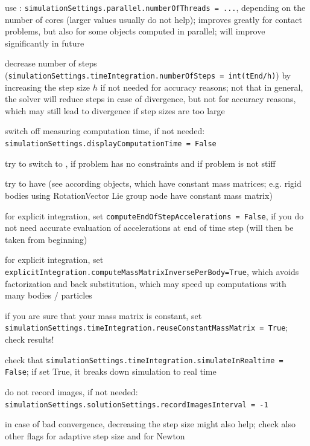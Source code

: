   \item use : \texttt{simulationSettings.parallel.numberOfThreads = ...}, depending on the number of cores (larger values usually do not help); improves greatly for contact problems, but also for some objects computed in parallel; will improve significantly in future
  \item decrease number of steps (\texttt{simulationSettings.timeIntegration.numberOfSteps = int(tEnd/h)}) by increasing the step size $h$ if not needed for accuracy reasons; not that in general, the solver will reduce steps in case of divergence, but not for accuracy reasons, which may still lead to divergence if step sizes are too large
  \item switch off measuring computation time, if not needed: \texttt{simulationSettings.displayComputationTime = False}
  \item try to switch to , if problem has no constraints and if problem is not stiff
  \item try to have  (see according objects, which have constant mass matrices; e.g. rigid bodies using RotationVector Lie group node have constant mass matrix)
  \item for explicit integration, set \texttt{computeEndOfStepAccelerations = False}, if you do not need accurate evaluation of accelerations at end of time step (will then be taken from beginning)
  \item for explicit integration, set \texttt{explicitIntegration.computeMassMatrixInversePerBody=True}, which avoids factorization and back substitution, which may speed up computations with many bodies / particles
  \item if you are sure that your mass matrix is constant, set \texttt{simulationSettings.timeIntegration.reuseConstantMassMatrix = True}; check results!
  \item check that \texttt{simulationSettings.timeIntegration.simulateInRealtime = False}; if set True, it breaks down simulation to real time
  \item do not record images, if not needed: \texttt{simulationSettings.solutionSettings.recordImagesInterval = -1}
  \item in case of bad convergence, decreasing the step size might also help; check also other flags for adaptive step size and for Newton
